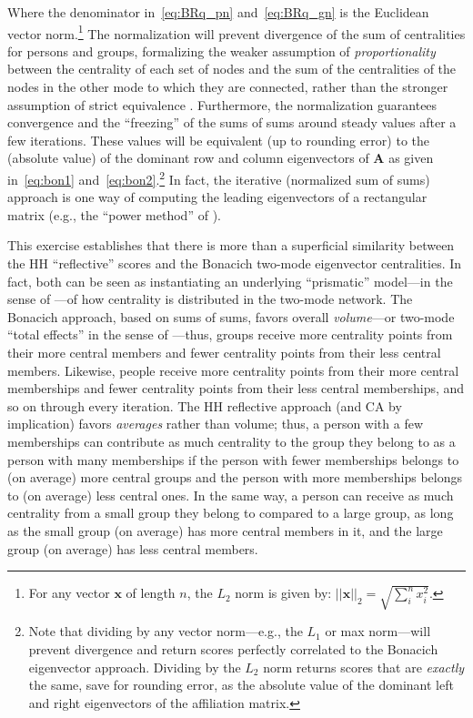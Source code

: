 \documentclass[a4paper,fleqn]{cas-sc}
\begin{document}
Where the denominator in~\ref{eq:BRq_pn} and~\ref{eq:BRq_gn} is the Euclidean vector norm.\footnote{For any vector $\mathbf{x}$ of length $n$, the $L_2$ norm is given by: $||\mathbf{x}||_2 = \sqrt{\sum_i^n x_i^2}$.} The normalization will prevent divergence of the sum of centralities for persons and groups, formalizing the weaker assumption of \textit{proportionality} between the centrality of each set of nodes and the sum of the centralities of the nodes in the other mode to which they are connected, rather than the stronger assumption of strict equivalence \citep{bonacich_lloyd01}. Furthermore, the normalization guarantees convergence and the ``freezing'' of the sums of sums around steady values after a few iterations. These values will be equivalent (up to rounding error) to the (absolute value) of the dominant row and column eigenvectors of $\mathbf{A}$ as given in~\ref{eq:bon1} and~\ref{eq:bon2}.\footnote{Note that dividing by any vector norm---e.g., the $L_1$ or max norm---will prevent divergence and return scores perfectly correlated to the Bonacich eigenvector approach. Dividing by the $L_2$ norm returns scores that are \textit{exactly} the same, save for rounding error, as the absolute value of the dominant left and right eigenvectors of the affiliation matrix.} In fact, the iterative (normalized sum of sums) approach is one way of computing the leading eigenvectors of a rectangular matrix (e.g., the ``power method'' of \citet{mises1929praktische}). 

This exercise establishes that there is more than a superficial similarity between the HH ``reflective'' scores and the Bonacich two-mode eigenvector centralities. In fact, both can be seen as instantiating an underlying ``prismatic'' model---in the sense of \citet{podolny2001networks}---of how centrality is distributed in the two-mode network. The Bonacich approach, based on sums of sums, favors overall \textit{volume}---or two-mode ``total effects'' in the sense of \citet{friedkin1991theoretical}---thus, groups receive more centrality points from their more central members and fewer centrality points from their less central members. Likewise, people receive more centrality points from their more central memberships and fewer centrality points from their less central memberships, and so on through every iteration. The HH reflective approach (and CA by implication) favors \textit{averages} rather than volume; thus, a person with a few memberships can contribute as much centrality to the group they belong to as a person with many memberships if the person with fewer memberships belongs to (on average) more central groups and the person with more memberships belongs to (on average) less central ones. In the same way, a person can receive as much centrality from a small group they belong to compared to a large group, as long as the small group (on average) has more central members in it, and the large group (on average) has less central members.  
\end{document}
